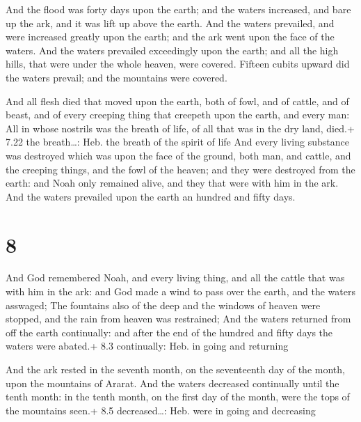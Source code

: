  And the flood was forty days upon the earth; and the
waters increased, and bare up the ark, and it was lift up above the
earth.  And the waters prevailed, and were increased
greatly upon the earth; and the ark went upon the face of the waters.
 And the waters prevailed exceedingly upon the earth; and
all the high hills, that were under the whole heaven, were covered.
 Fifteen cubits upward did the waters prevail; and the
mountains were covered.

 And all flesh died that moved upon the earth, both of
fowl, and of cattle, and of beast, and of every creeping thing that
creepeth upon the earth, and every man:  All in whose
nostrils was the breath of life, of all that was in the dry land, died.+
7.22 the breath\ldots: Heb. the breath of the spirit of life
 And every living substance was destroyed which was upon
the face of the ground, both man, and cattle, and the creeping things,
and the fowl of the heaven; and they were destroyed from the earth: and
Noah only remained alive, and they that were with him in the ark.
 And the waters prevailed upon the earth an hundred and
fifty days.

\hypertarget{section-7}{%
\section{8}\label{section-7}}

 And God remembered Noah, and every living thing, and all
the cattle that was with him in the ark: and God made a wind to pass
over the earth, and the waters asswaged;  The fountains also
of the deep and the windows of heaven were stopped, and the rain from
heaven was restrained;  And the waters returned from off the
earth continually: and after the end of the hundred and fifty days the
waters were abated.+ 8.3 continually: Heb. in going and returning

 And the ark rested in the seventh month, on the seventeenth
day of the month, upon the mountains of Ararat.  And the
waters decreased continually until the tenth month: in the tenth month,
on the first day of the month, were the tops of the mountains seen.+ 8.5
decreased\ldots: Heb. were in going and decreasing

